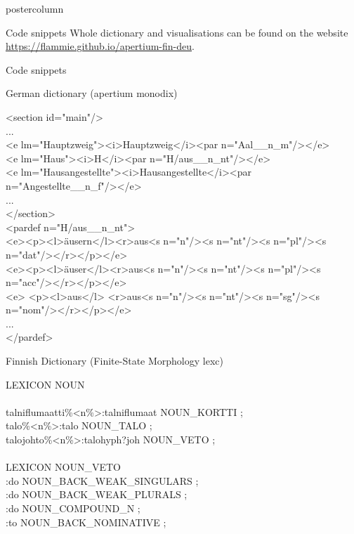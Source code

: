 \documentclass[final,hyperref={pdfpagelabels}]{beamer}
\begin{document}
\begin{frame}
\begin{columns}
\begin{column}{.49\textwidth}
\begin{beamercolorbox}[center,wd=\textwidth]{postercolumn}
\begin{minipage}[T]{.95\textwidth}
{              \begin{block}{Code snippets}
            Whole dictionary and visualisations can be found on the website
            \url{https://flammie.github.io/apertium-fin-deu}.
              \end{block}{Code snippets}

            \begin{block}{German dictionary (apertium monodix)}
            \begin{texttt}
                <section id="main"/> \\
... \\
  <e lm="Hauptzweig"><i>Hauptzweig</i><par n="Aal\_\_n\_m"/></e> \\
  <e lm="Haus"><i>H</i><par n="H/aus\_\_n\_nt"/></e> \\
  <e lm="Hausangestellte"><i>Hausangestellte</i><par n="Angestellte\_\_n\_f"/></e> \\
... \\
</section> \\
<pardef n="H/aus\_\_n\_nt"> \\
  <e><p><l>äusern</l><r>aus<s n="n"/><s n="nt"/><s n="pl"/><s n="dat"/></r></p></e> \\
  <e><p><l>äuser</l><r>aus<s n="n"/><s n="nt"/><s n="pl"/><s n="acc"/></r></p></e> \\
  <e>       <p><l>aus</l>       <r>aus<s n="n"/><s n="nt"/><s n="sg"/><s n="nom"/></r></p></e> \\
  ... \\
</pardef>\end{texttt}
            \end{block}

            \begin{block}{Finnish Dictionary (Finite-State Morphology lexc)}
            \begin{texttt}
LEXICON NOUN \\
 \\
talniflumaatti\%<n\%>:talniflumaat        NOUN\_KORTTI     ; \\
talo\%<n\%>:talo  NOUN\_TALO       ; \\
talojohto\%<n\%>:talo{hyph?}joh   NOUN\_VETO       ; \\
 \\
LEXICON NOUN\_VETO \\
:do     NOUN\_BACK\_WEAK\_SINGULARS ; \\
:do     NOUN\_BACK\_WEAK\_PLURALS ; \\
:do     NOUN\_COMPOUND\_N ; \\
:to     NOUN\_BACK\_NOMINATIVE ; \\
            \end{texttt}
            \end{block}

}
\end{minipage}
\end{beamercolorbox}
\end{column}
\end{columns}
\end{frame}
\end{document}
